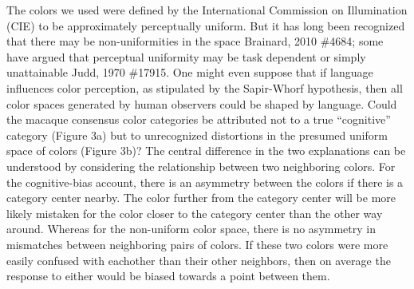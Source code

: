The colors we used were defined by the International Commission on Illumination (CIE) to be approximately perceptually uniform. But it has long been recognized that there may be non-uniformities in the space {Brainard, 2010 \#4684}; some have argued that perceptual uniformity may be task dependent or simply unattainable {Judd, 1970 \#17915}. One might even suppose that if language influences color perception, as stipulated by the Sapir-Whorf hypothesis, then all color spaces generated by human observers could be shaped by language. Could the macaque consensus color categories be attributed not to a true “cognitive” category (Figure 3a) but to unrecognized distortions in the presumed uniform space of colors (Figure 3b)? The central difference in the two explanations can be understood by considering the relationship between two neighboring colors. For the cognitive-bias account, there is an asymmetry between the colors if there is a category center nearby. The color further from the category center will be more likely mistaken for the color closer to the category center than the other way around. Whereas for the non-uniform color space, there is no asymmetry in mismatches between neighboring pairs of colors. If these two colors were more easily confused with eachother than their other neighbors, then on average the response to either would be biased towards a point between them.

